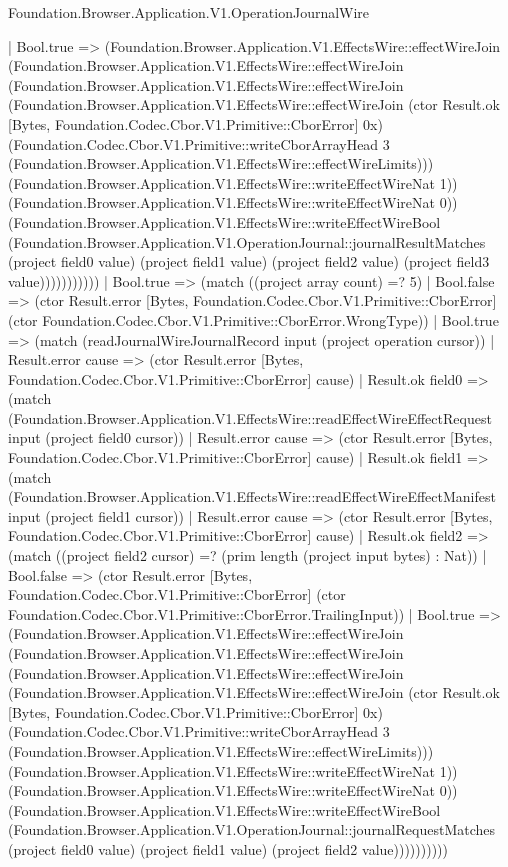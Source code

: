 \begin{lexlean}{Foundation.Browser.Application.V1.OperationJournalWire}
\begin{semanticmodule}
{                                  | Bool.true => (Foundation.Browser.Application.V1.EffectsWire::effectWireJoin (Foundation.Browser.Application.V1.EffectsWire::effectWireJoin (Foundation.Browser.Application.V1.EffectsWire::effectWireJoin (Foundation.Browser.Application.V1.EffectsWire::effectWireJoin (ctor Result.ok [Bytes, Foundation.Codec.Cbor.V1.Primitive::CborError] 0x) (Foundation.Codec.Cbor.V1.Primitive::writeCborArrayHead 3 (Foundation.Browser.Application.V1.EffectsWire::effectWireLimits))) (Foundation.Browser.Application.V1.EffectsWire::writeEffectWireNat 1)) (Foundation.Browser.Application.V1.EffectsWire::writeEffectWireNat 0)) (Foundation.Browser.Application.V1.EffectsWire::writeEffectWireBool (Foundation.Browser.Application.V1.OperationJournal::journalResultMatches (project field0 value) (project field1 value) (project field2 value) (project field3 value)))))))))))
                    | Bool.true => (match ((project array count) =? 5)
                      | Bool.false => (ctor Result.error [Bytes, Foundation.Codec.Cbor.V1.Primitive::CborError] (ctor Foundation.Codec.Cbor.V1.Primitive::CborError.WrongType))
                      | Bool.true => (match (readJournalWireJournalRecord input (project operation cursor))
                        | Result.error cause => (ctor Result.error [Bytes, Foundation.Codec.Cbor.V1.Primitive::CborError] cause)
                        | Result.ok field0 => (match (Foundation.Browser.Application.V1.EffectsWire::readEffectWireEffectRequest input (project field0 cursor))
                          | Result.error cause => (ctor Result.error [Bytes, Foundation.Codec.Cbor.V1.Primitive::CborError] cause)
                          | Result.ok field1 => (match (Foundation.Browser.Application.V1.EffectsWire::readEffectWireEffectManifest input (project field1 cursor))
                            | Result.error cause => (ctor Result.error [Bytes, Foundation.Codec.Cbor.V1.Primitive::CborError] cause)
                            | Result.ok field2 => (match ((project field2 cursor) =? (prim length (project input bytes) : Nat))
                              | Bool.false => (ctor Result.error [Bytes, Foundation.Codec.Cbor.V1.Primitive::CborError] (ctor Foundation.Codec.Cbor.V1.Primitive::CborError.TrailingInput))
                              | Bool.true => (Foundation.Browser.Application.V1.EffectsWire::effectWireJoin (Foundation.Browser.Application.V1.EffectsWire::effectWireJoin (Foundation.Browser.Application.V1.EffectsWire::effectWireJoin (Foundation.Browser.Application.V1.EffectsWire::effectWireJoin (ctor Result.ok [Bytes, Foundation.Codec.Cbor.V1.Primitive::CborError] 0x) (Foundation.Codec.Cbor.V1.Primitive::writeCborArrayHead 3 (Foundation.Browser.Application.V1.EffectsWire::effectWireLimits))) (Foundation.Browser.Application.V1.EffectsWire::writeEffectWireNat 1)) (Foundation.Browser.Application.V1.EffectsWire::writeEffectWireNat 0)) (Foundation.Browser.Application.V1.EffectsWire::writeEffectWireBool (Foundation.Browser.Application.V1.OperationJournal::journalRequestMatches (project field0 value) (project field1 value) (project field2 value))))))))))
}
\end{semanticmodule}
\end{lexlean}
